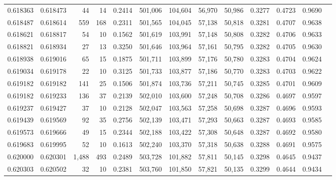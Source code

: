 \begin{tabular}{rrrrrrrrrrrrr}
0.618363 & 0.618473 &    44 &  14 &                                     0.2414 & 501,006 & 104,604 &  56,970 &  50,986 & 0.3277 & 0.4723 & 0.9690 \\
0.618487 & 0.618614 &   559 & 168 &                                     0.2311 & 501,565 & 104,045 &  57,138 &  50,818 & 0.3281 & 0.4707 & 0.9638 \\
0.618621 & 0.618817 &    54 &  10 &                                     0.1562 & 501,619 & 103,991 &  57,148 &  50,808 & 0.3282 & 0.4706 & 0.9633 \\
0.618821 & 0.618934 &    27 &  13 &                                     0.3250 & 501,646 & 103,964 &  57,161 &  50,795 & 0.3282 & 0.4705 & 0.9630 \\
0.618938 & 0.619016 &    65 &  15 &                                     0.1875 & 501,711 & 103,899 &  57,176 &  50,780 & 0.3283 & 0.4704 & 0.9624 \\
0.619034 & 0.619178 &    22 &  10 &                                     0.3125 & 501,733 & 103,877 &  57,186 &  50,770 & 0.3283 & 0.4703 & 0.9622 \\
0.619182 & 0.619182 &   141 &  25 &                                     0.1506 & 501,874 & 103,736 &  57,211 &  50,745 & 0.3285 & 0.4701 & 0.9609 \\
0.619182 & 0.619233 &   136 &  37 &                                     0.2139 & 502,010 & 103,600 &  57,248 &  50,708 & 0.3286 & 0.4697 & 0.9597 \\
0.619237 & 0.619427 &    37 &  10 &                                     0.2128 & 502,047 & 103,563 &  57,258 &  50,698 & 0.3287 & 0.4696 & 0.9593 \\
0.619439 & 0.619569 &    92 &  35 &                                     0.2756 & 502,139 & 103,471 &  57,293 &  50,663 & 0.3287 & 0.4693 & 0.9585 \\
0.619573 & 0.619666 &    49 &  15 &                                     0.2344 & 502,188 & 103,422 &  57,308 &  50,648 & 0.3287 & 0.4692 & 0.9580 \\
0.619683 & 0.619995 &    52 &  10 &                                     0.1613 & 502,240 & 103,370 &  57,318 &  50,638 & 0.3288 & 0.4691 & 0.9575 \\
0.620000 & 0.620301 & 1,488 & 493 &                                     0.2489 & 503,728 & 101,882 &  57,811 &  50,145 & 0.3298 & 0.4645 & 0.9437 \\
0.620303 & 0.620502 &    32 &  10 &                                     0.2381 & 503,760 & 101,850 &  57,821 &  50,135 & 0.3299 & 0.4644 & 0.9434 \\

\end{tabular}
